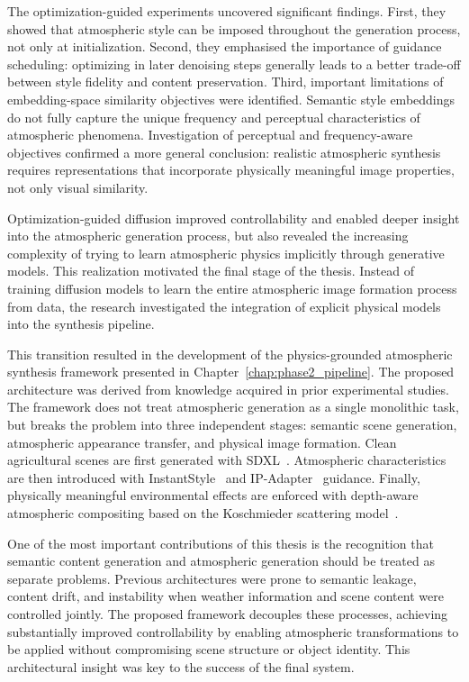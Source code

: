 \noindent The optimization-guided experiments uncovered significant findings. First, they showed that atmospheric style can be imposed throughout the generation process, not only at initialization. Second, they emphasised the importance of guidance scheduling: optimizing in later denoising steps generally leads to a better trade-off between style fidelity and content preservation. Third, important limitations of embedding-space similarity objectives were identified. Semantic style embeddings do not fully capture the unique frequency and perceptual characteristics of atmospheric phenomena. Investigation of perceptual and frequency-aware objectives confirmed a more general conclusion: realistic atmospheric synthesis requires representations that incorporate physically meaningful image properties, not only visual similarity.

\noindent Optimization-guided diffusion improved controllability and enabled deeper insight into the atmospheric generation process, but also revealed the increasing complexity of trying to learn atmospheric physics implicitly through generative models. This realization motivated the final stage of the thesis. Instead of training diffusion models to learn the entire atmospheric image formation process from data, the research investigated the integration of explicit physical models into the synthesis pipeline.

\noindent This transition resulted in the development of the physics-grounded atmospheric synthesis framework presented in Chapter~\ref{chap:phase2_pipeline}. The proposed architecture was derived from knowledge acquired in prior experimental studies. The framework does not treat atmospheric generation as a single monolithic task, but breaks the problem into three independent stages: semantic scene generation, atmospheric appearance transfer, and physical image formation. Clean agricultural scenes are first generated with SDXL~\cite{podell2023sdxlimprovinglatentdiffusion}. Atmospheric characteristics are then introduced with InstantStyle~\cite{wang2024instantstyle} and IP-Adapter~\cite{ye2023ipadapterfidelityadapters} guidance. Finally, physically meaningful environmental effects are enforced with depth-aware atmospheric compositing based on the Koschmieder scattering model~\cite{koschmieder1924theorie}.

\noindent One of the most important contributions of this thesis is the recognition that semantic content generation and atmospheric generation should be treated as separate problems. Previous architectures were prone to semantic leakage, content drift, and instability when weather information and scene content were controlled jointly. The proposed framework decouples these processes, achieving substantially improved controllability by enabling atmospheric transformations to be applied without compromising scene structure or object identity. This architectural insight was key to the success of the final system.

